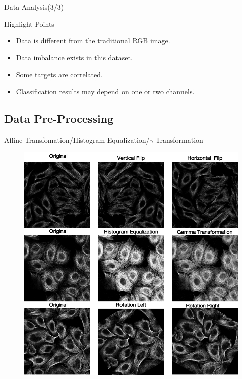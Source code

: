 \documentclass[unknownkeysallowed]{beamer}
\begin{document}
	\begin{frame}{Data Analysis(3/3)}
	\begin{block}{Highlight Points}
		\begin{itemize}
			\item Data is different from the traditional RGB image.
			\item Data imbalance exists in this dataset.
			\item Some targets are correlated.
			\item Classification results may depend on one or two channels.
		\end{itemize}
	\end{block}
	\end{frame}

	\subsection{Data Pre-Processing}
	\begin{frame}
	\begin{block}{Affine Transfomation/Histogram Equalization/$\gamma$ Transformation}
		\begin{figure}
			\includegraphics[width=0.6\paperwidth,height=0.8\paperheight]{images/pre_processing}
		\end{figure}
	\end{block}
	\end{frame}
\end{document}
